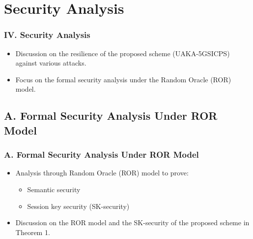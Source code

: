 \documentclass[9pt,handout]{beamer}
\begin{document}
\section{Security Analysis}
\begin{frame}
    \frametitle{IV. Security Analysis}
    \begin{itemize}
        \item Discussion on the resilience of the proposed scheme (UAKA-5GSICPS) against various attacks.
        \item Focus on the formal security analysis under the Random Oracle (ROR) model.
    \end{itemize}
\end{frame}
\subsection{A. Formal Security Analysis Under ROR Model}
\begin{frame}
    \frametitle{A. Formal Security Analysis Under ROR Model}
    \begin{itemize}
        \item Analysis through Random Oracle (ROR) model to prove:
            \begin{itemize}
                \item Semantic security
                \item Session key security (SK-security)
            \end{itemize}
        \item Discussion on the ROR model and the SK-security of the proposed scheme in Theorem 1.
    \end{itemize}
\end{frame}
\end{document}

